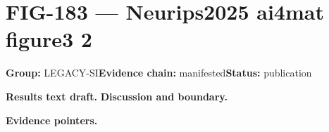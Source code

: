 \clearpage
\section{FIG-183 --- Neurips2025 ai4mat figure3 2}
\label{figpage:fig-183}
\textbf{Group:} LEGACY-SI\quad \textbf{Evidence chain:} manifested\quad \textbf{Status:} publication

\textbf{Results text draft.} 
\textbf{Discussion and boundary.} 


\textbf{Evidence pointers.}



\vfill

